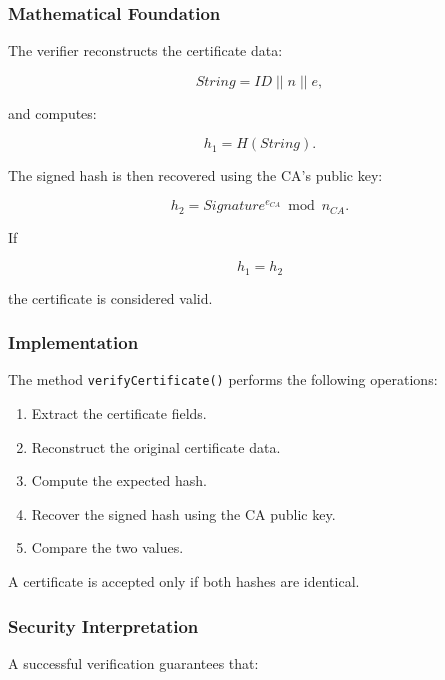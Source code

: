 \documentclass[12pt]{article}
\begin{document}
\subsubsection{Mathematical Foundation}

The verifier reconstructs the certificate data:

\begin{equation}
String = ID \; || \; n \; || \; e,
\end{equation}

and computes:

\begin{equation}
h_1 = H(String).
\end{equation}

The signed hash is then recovered using the CA's public key:

\begin{equation}
h_2 = Signature^{e_{CA}} \bmod n_{CA}.
\end{equation}

If

\begin{equation}
h_1 = h_2
\end{equation}

the certificate is considered valid.

\subsubsection{Implementation}

The method \texttt{verifyCertificate()} performs the following operations:

\begin{enumerate}
\item Extract the certificate fields.
\item Reconstruct the original certificate data.
\item Compute the expected hash.
\item Recover the signed hash using the CA public key.
\item Compare the two values.
\end{enumerate}

A certificate is accepted only if both hashes are identical.

\subsubsection{Security Interpretation}

A successful verification guarantees that:
\end{document}
